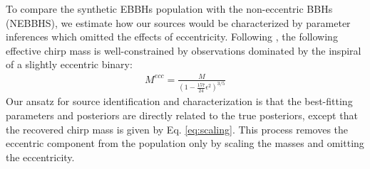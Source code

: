 \documentclass[twocolumn,prd,nofootinbib]{revtex4}
\begin{document}
To compare the synthetic EBBHs population with the non-eccentric BBHs (NEBBHS), we estimate how our sources would be characterized by parameter inferences which omitted the effects of eccentricity.  Following \cite{favata-scaling-2022}, the following effective chirp mass is well-constrained by observations dominated by the inspiral of a slightly eccentric binary:
\begin{align}
\label{eq:scaling}
M^{ecc} = \frac{M}{(1-\frac{157}{24}\epsilon^2)^{3/5}}
\end{align}
%
Our ansatz for source identification and characterization is that the best-fitting parameters and posteriors are directly related to the true posteriors, except that the recovered chirp mass is given by  Eq. \ref{eq:scaling}.  This process removes the eccentric component from the population only by scaling the masses and omitting the eccentricity. 





    \label{tab:popscl_prop}
 
\end{document}
